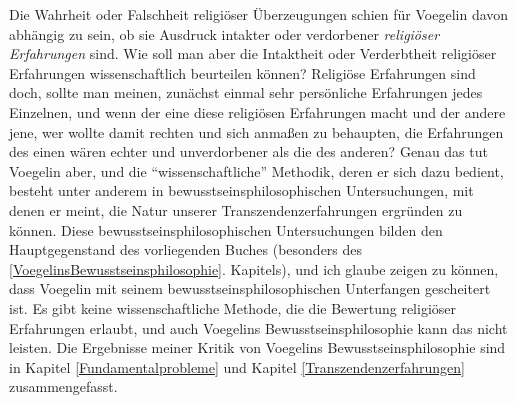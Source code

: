 Die Wahrheit oder Falschheit religiöser Überzeugungen schien für Voegelin
davon abhängig zu sein, ob sie Ausdruck intakter oder verdorbener {\em
  religiöser Erfahrungen} sind. Wie soll man aber die Intaktheit oder
Verderbtheit religiöser Erfahrungen wissenschaftlich beurteilen können?
Religiöse Erfahrungen sind doch, sollte man meinen, zunächst einmal sehr
persönliche Erfahrungen jedes Einzelnen, und wenn der eine diese religiösen
Erfahrungen macht und der andere jene, wer wollte damit rechten und sich
anmaßen zu behaupten, die Erfahrungen des einen wären echter und unverdorbener
als die des anderen? Genau das tut Voegelin aber, und die
``wissenschaftliche'' Methodik, deren er sich dazu bedient, besteht unter
anderem in bewusstseinsphilosophischen Untersuchungen, mit denen er meint, die
Natur unserer Transzendenzerfahrungen ergründen zu können. Diese
bewusstseinsphilosophischen Untersuchungen bilden den Hauptgegenstand des
vorliegenden Buches (besonders des \ref{VoegelinsBewusstseinsphilosophie}.
Kapitels), und ich glaube zeigen zu können, dass Voegelin mit seinem
bewusstseinsphilosophischen Unterfangen gescheitert ist. Es gibt keine
wissenschaftliche Methode, die die Bewertung religiöser Erfahrungen erlaubt,
und auch Voegelins Bewusstseinsphilosophie kann das nicht leisten.  Die
Ergebnisse meiner Kritik von Voegelins Bewusstseinsphilosophie sind in Kapitel
\ref{Fundamentalprobleme} und Kapitel \ref{Transzendenzerfahrungen}
zusammengefasst.

